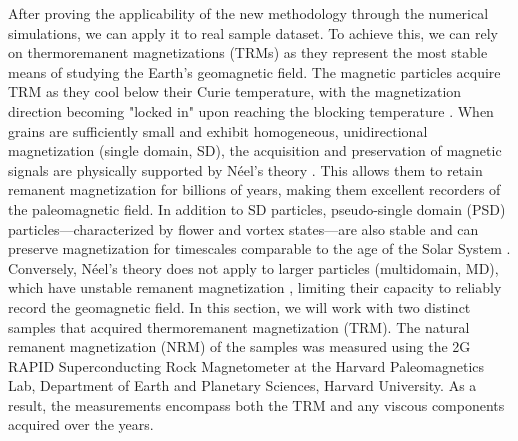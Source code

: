 After proving the applicability of the new methodology through the numerical simulations, we can apply it to real sample dataset. To achieve this, we can rely on thermoremanent magnetizations (TRMs) as they represent the most stable means of studying the Earth's geomagnetic field. The magnetic particles \citep[most commonly magnetite,][]{OReilly1984} acquire TRM as they cool below their Curie temperature, with the magnetization direction becoming "locked in" upon reaching the blocking temperature \citep{Dunlop1997}. When grains are sufficiently small and exhibit homogeneous, unidirectional magnetization (single domain, SD), the acquisition and preservation of magnetic signals are physically supported by Néel’s theory \citep{Neel1949, Neel1955}. This allows them to retain remanent magnetization for billions of years, making them excellent recorders of the paleomagnetic field. In addition to SD particles, pseudo-single domain (PSD) particles—characterized by flower and vortex states—are also stable and can preserve magnetization for timescales comparable to the age of the Solar System \citep{Nagy2017, Lascu2018}. Conversely, Néel’s theory does not apply to larger particles (multidomain, MD), which have unstable remanent magnetization \citep[e.g., due to viscous domain reorganization,][]{DeGroot2014}, limiting their capacity to reliably record the geomagnetic field. In this section, we will work with two distinct samples that acquired thermoremanent magnetization (TRM). The natural remanent magnetization (NRM) of the samples was measured using the 2G RAPID Superconducting Rock Magnetometer at the Harvard Paleomagnetics Lab, Department of Earth and Planetary Sciences, Harvard University. As a result, the measurements encompass both the TRM and any viscous components acquired over the years.

